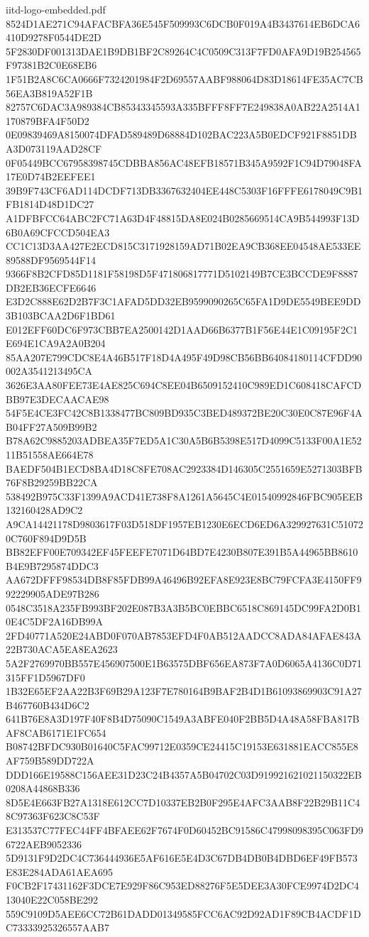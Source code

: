 \begin{filecontents*}[overwrite]{iitd-logo-embedded.pdf}
8524D1AE271C94AFACBFA36E545F509993C6DCB0F019A4B3437614EB6DCA6410D9278F0544DE2D
5F2830DF001313DAE1B9DB1BF2C89264C4C0509C313F7FD0AFA9D19B254565F97381B2C0E68EB6
1F51B2A8C6CA0666F7324201984F2D69557AABF988064D83D18614FE35AC7CB56EA3B819A52F1B
82757C6DAC3A989384CB85343345593A335BFFF8FF7E249838A0AB22A2514A1170879BFA4F50D2
0E09839469A8150074DFAD589489D68884D102BAC223A5B0EDCF921F8851DBA3D073119AAD28CF
0F05449BCC67958398745CDBBA856AC48EFB18571B345A9592F1C94D79048FA17E0D74B2EEFEE1
39B9F743CF6AD114DCDF713DB3367632404EE448C5303F16FFFE6178049C9B1FB1814D48D1DC27
A1DFBFCC64ABC2FC71A63D4F48815DA8E024B0285669514CA9B544993F13D6B0A69CFCCD504EA3
CC1C13D3AA427E2ECD815C3171928159AD71B02EA9CB368EE04548AE533EE89588DF9569544F14
9366F8B2CFD85D1181F58198D5F471806817771D5102149B7CE3BCCDE9F8887DB2EB36ECFE6646
E3D2C888E62D2B7F3C1AFAD5DD32EB9599090265C65FA1D9DE5549BEE9DD3B103BCAA2D6F1BD61
E012EFF60DC6F973CBB7EA2500142D1AAD66B6377B1F56E44E1C09195F2C1E694E1CA9A2A0B204
85AA207E799CDC8E4A46B517F18D4A495F49D98CB56BB64084180114CFDD90002A3541213495CA
3626E3AA80FEE73E4AE825C694C8EE04B6509152410C989ED1C608418CAFCDBB97E3DECAACAE98
54F5E4CE3FC42C8B1338477BC809BD935C3BED489372BE20C30E0C87E96F4AB04FF27A509B99B2
B78A62C9885203ADBEA35F7ED5A1C30A5B6B5398E517D4099C5133F00A1E5211B51558AE664E78
BAEDF504B1ECD8BA4D18C8FE708AC2923384D146305C2551659E5271303BFB76F8B29259BB22CA
538492B975C33F1399A9ACD41E738F8A1261A5645C4E01540992846FBC905EEB132160428AD9C2
A9CA14421178D9803617F03D518DF1957EB1230E6ECD6ED6A329927631C510720C760F894D9D5B
BB82EFF00E709342EF45FEEFE7071D64BD7E4230B807E391B5A44965BB8610B4E9B7295874DDC3
AA672DFFF98534DB8F85FDB99A46496B92EFA8E923E8BC79FCFA3E4150FF992229905ADE97B286
0548C3518A235FB993BF202E087B3A3B5BC0EBBC6518C869145DC99FA2D0B10E4C5DF2A16DB99A
2FD40771A520E24ABD0F070AB7853EFD4F0AB512AADCC8ADA84AFAE843A22B730ACA5EA8EA2623
5A2F2769970BB557E456907500E1B63575DBF656EA873F7A0D6065A4136C0D71315FF1D5967DF0
1B32E65EF2AA22B3F69B29A123F7E780164B9BAF2B4D1B61093869903C91A27B467760B434D6C2
641B76E8A3D197F40F8B4D75090C1549A3ABFE040F2BB5D4A48A58FBA817BAF8CAB6171E1FC654
B08742BFDC930B01640C5FAC99712E0359CE24415C19153E631881EACC855E8AF759B589DD722A
DDD166E19588C156AEE31D23C24B4357A5B04702C03D919921621021150322EB0208A44868B336
8D5E4E663FB27A1318E612CC7D10337EB2B0F295E4AFC3AAB8F22B29B11C48C97363F623C8C53F
E313537C77FEC44FF4BFAEE62F7674F0D60452BC91586C47998098395C063FD96722AEB9052336
5D9131F9D2DC4C736444936E5AF616E5E4D3C67DB4DB0B4DBD6EF49FB573E83E284ADA61AEA695
F0CB2F17431162F3DCE7E929F86C953ED88276F5E5DEE3A30FCE9974D2DC413040E22C058BE292
559C9109D5AEE6CC72B61DADD01349585FCC6AC92D92AD1F89CB4ACDF1DC73333925326557AAB7

\end{filecontents*}

